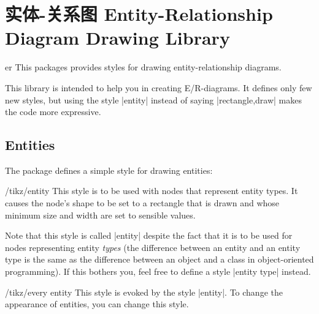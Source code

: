 %
%
%


\section{实体-关系图 Entity-Relationship Diagram Drawing Library}

\begin{tikzlibrary}{er}
    This packages provides styles for drawing entity-relationship diagrams.
\end{tikzlibrary}

This library is intended to help you in creating E/R-diagrams. It defines only
few new styles, but using the style |entity| instead of saying |rectangle,draw|
makes the code more expressive.


\subsection{Entities}

The package defines a simple style for drawing entities:

\begin{stylekey}{/tikz/entity}
    This style is to be used with nodes that represent entity types. It causes
    the node's shape to be set to a rectangle that is drawn and whose minimum
    size and width are set to sensible values.

    Note that this style is called |entity| despite the fact that it is to be
    used for nodes representing entity \emph{types} (the difference between an
    entity and an entity type is the same as the difference between an object
    and a class in object-oriented programming). If this bothers you, feel free
    to define a style |entity type| instead.
\begin{codeexample}[preamble={\usetikzlibrary{er,positioning}}]
\end{codeexample}
\end{stylekey}

\begin{stylekey}{/tikz/every entity}
    This style is evoked by the style |entity|. To change the appearance of
    entities, you can change this style.
\begin{codeexample}[preamble={\usetikzlibrary{er,positioning}}]
\end{codeexample}
\end{stylekey}


